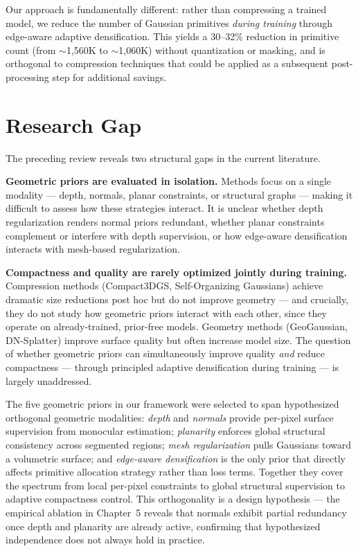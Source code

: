 Our approach is fundamentally different: rather than compressing a trained model, we reduce the number of Gaussian primitives \emph{during training} through edge-aware adaptive densification. This yields a 30--32\% reduction in primitive count (from $\sim$1{,}560K to $\sim$1{,}060K) without quantization or masking, and is orthogonal to compression techniques that could be applied as a subsequent post-processing step for additional savings.

\section{Research Gap}

The preceding review reveals two structural gaps in the current literature.

\textbf{Geometric priors are evaluated in isolation.} Methods focus on a single modality — depth, normals, planar constraints, or structural graphs — making it difficult to assess how these strategies interact. It is unclear whether depth regularization renders normal priors redundant, whether planar constraints complement or interfere with depth supervision, or how edge-aware densification interacts with mesh-based regularization.

\textbf{Compactness and quality are rarely optimized jointly during training.} Compression methods (Compact3DGS, Self-Organizing Gaussians) achieve dramatic size reductions post hoc but do not improve geometry — and crucially, they do not study how geometric priors interact with each other, since they operate on already-trained, prior-free models. Geometry methods (GeoGaussian, DN-Splatter) improve surface quality but often increase model size. The question of whether geometric priors can simultaneously improve quality \emph{and} reduce compactness — through principled adaptive densification during training — is largely unaddressed.

The five geometric priors in our framework were selected to span hypothesized orthogonal geometric modalities: \textit{depth} and \textit{normals} provide per-pixel surface supervision from monocular estimation; \textit{planarity} enforces global structural consistency across segmented regions; \textit{mesh regularization} pulls Gaussians toward a volumetric surface; and \textit{edge-aware densification} is the only prior that directly affects primitive allocation strategy rather than loss terms. Together they cover the spectrum from local per-pixel constraints to global structural supervision to adaptive compactness control. This orthogonality is a design hypothesis — the empirical ablation in Chapter~5 reveals that normals exhibit partial redundancy once depth and planarity are already active, confirming that hypothesized independence does not always hold in practice.

